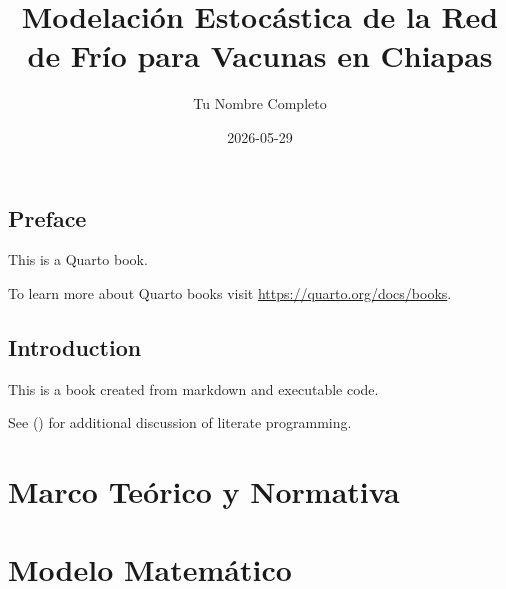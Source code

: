 \documentclass[
  spanish,
  letterpaper,
  DIV=11,
  numbers=noendperiod]{scrreprt}
\title{Modelación Estocástica de la Red de Frío para Vacunas en Chiapas}
\author{Tu Nombre Completo}
\date{2026-05-29}
\renewcommand*\contentsname{Tabla de contenidos}
\newcommand\contentsname{Tabla de contenidos}
\begin{document}
\maketitle

\renewcommand*\contentsname{Tabla de contenidos}
{
\hypersetup{linkcolor=}
\setcounter{tocdepth}{2}
\tableofcontents
}


\chapter*{Preface}\label{preface}


This is a Quarto book.

To learn more about Quarto books visit
\url{https://quarto.org/docs/books}.


\chapter{Introduction}\label{introduction}

This is a book created from markdown and executable code.

See () for additional
discussion of literate programming.

\part{Marco Teórico y Normativa}

\chapter{}\label{section}

\chapter{}\label{section-1}

\part{Modelo Matemático}

\chapter{}\label{section-2}
\end{document}
